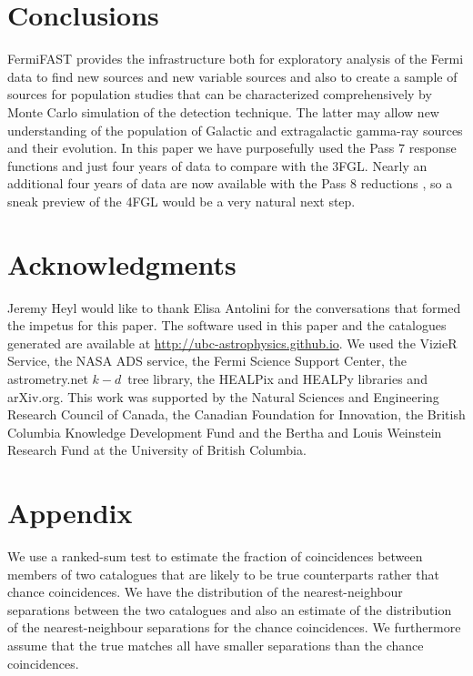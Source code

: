 \documentclass[useAMS,usenatbib]{mn2e}
\begin{document}
\section{Conclusions}
\label{sec:conclusions}

FermiFAST provides the infrastructure both for exploratory analysis of
the Fermi data to find new sources and new variable sources and also
to create a sample of sources for population studies that can be
characterized comprehensively by Monte Carlo simulation of the
detection technique.  The latter may allow new understanding of the
population of Galactic and extragalactic gamma-ray sources and their
evolution. In this paper we have purposefully used the Pass 7 response
functions and just four years of data to compare with the 3FGL.
Nearly an additional four years of data are now available with the
Pass 8 reductions \citep{2013arXiv1303.3514A}, so a sneak preview of
the 4FGL would be a very natural next step.

\section*{Acknowledgments}

Jeremy Heyl would like to thank Elisa Antolini for the conversations
that formed the impetus for this paper.  The software used in this
paper and the catalogues generated are available at
\url{http://ubc-astrophysics.github.io}.  We used the VizieR Service,
the NASA ADS service, the Fermi Science Support Center, the
astrometry.net $k-d$~tree library, the HEALPix and HEALPy libraries
and arXiv.org. This work was supported by the Natural Sciences and
Engineering Research Council of Canada, the Canadian Foundation for
Innovation, the British Columbia Knowledge Development Fund and the
Bertha and Louis Weinstein Research Fund at the University of British
Columbia.




\section*{Appendix}

We use a ranked-sum test to estimate the fraction of coincidences
between members of two catalogues that are likely to be true
counterparts rather that chance coincidences.  We have the
distribution of the nearest-neighbour separations between the two
catalogues and also an estimate of the distribution of the
nearest-neighbour separations for the chance coincidences.  We
furthermore assume that the true matches all have smaller separations
than the chance coincidences.
\end{document}
